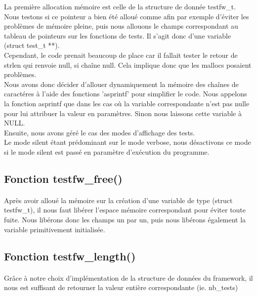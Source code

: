 \documentclass[12pt]{article}
\begin{document}
La première allocation mémoire est celle de la structure de donnée testfw\_t. Nous testons si ce pointeur a bien été alloué comme afin par exemple d'éviter les problèmes de mémoire pleine, puis nous allouons le champs correspondant au tableau de pointeurs sur les fonctions de tests. Il s'agit donc d'une variable (struct test\_t **). \\

Cependant, le code prenait beaucoup de place car il fallait tester le retour de strlen qui renvoie null, si chaîne null. Cela implique donc que les mallocs posaient problèmes. \\

Nous avons donc décider d'allouer dynamiquement la mémoire des chaînes de caractéres à l'aide des fonctions 'asprintf' pour simplifier le code. Nous appelons la fonction asprintf que dans les cas où la variable correspondante n'est pas nulle pour lui attribuer la valeur en paramètres. Sinon nous laissons cette variable à NULL. \\

Ensuite, nous avons géré le cas des modes d'affichage des tests.\\
Le mode silent étant prédominant sur le mode verbose, nous désactivons ce mode si le mode silent est passé en paramètre d'exécution du programme.\\


\subsection{Fonction testfw\_free()}

\paragraph{}
Après avoir alloué la mémoire sur la création d'une variable de type (struct testfw\_t), il nous faut libérer l'espace mémoire correspondant pour éviter toute fuite. Nous libérons donc les champs un par un, puis nous libérons également la variable primitivement initialisée.


\subsection{Fonction testfw\_length()}

\paragraph{}
Grâce à notre choix d'implémentation de la structure de données du framework, il nous est suffisant de retourner la valeur entière correspondante (ie.  nb\_tests)\\
\end{document}
